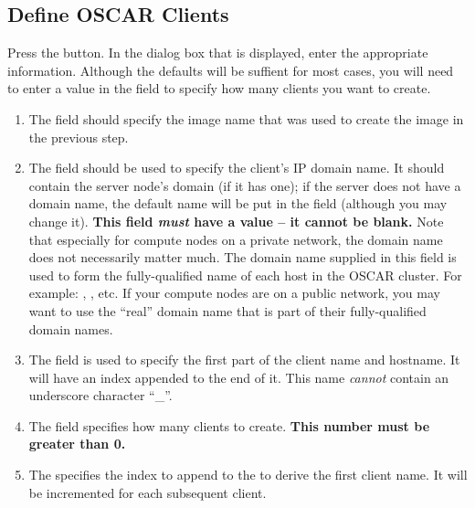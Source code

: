 \subsection{Define OSCAR Clients}
\label{det:define-clients}

Press the  button.  In the dialog box
that is displayed, enter the appropriate information.  Although the
defaults will be suffient for most cases, you will need to enter a
value in the  field to specify how many clients
you want to create.

\begin{enumerate}
  
\item The  field should specify the image name that
  was used to create the image in the previous step.
  
\item The  field should be used to specify the
  client's IP domain name.  
%
  It should contain the server node's domain (if it has one); if the
  server does not have a domain name, the default name
   will be put in the field (although you may
  change it).
%
  {\bf This field \emph{must} have a value -- it cannot be blank.}
%
  Note that especially for compute nodes on a private network, the
  domain name does not necessarily matter much.  The domain name
  supplied in this field is used to form the fully-qualified name of
  each host in the OSCAR cluster.  For example:
  ,
  , etc.  If your compute nodes are
  on a public network, you may want to use the ``real'' domain name
  that is part of their fully-qualified domain names.

\item The  field is used to specify the first part of
  the client name and hostname. It will have an index appended to the
  end of it. This name \emph{cannot} contain an underscore 
  character ``\_''.

\item The  field specifies how many clients to
  create.  {\bf This number must be greater than 0.}
  
\item The  specifies the index to append to the
   to derive the first client name. It will be
  incremented for each subsequent client.


\end{enumerate}
